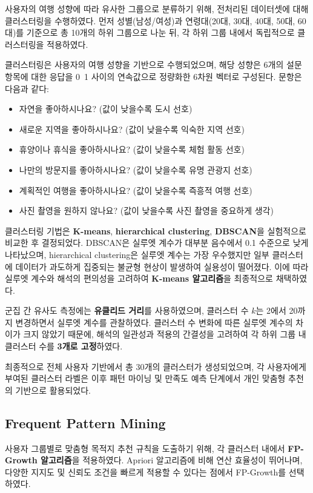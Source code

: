 \documentclass[sigconf]{acmart}
\begin{document}
\begin{CJK}{UTF8}{mj}
사용자의 여행 성향에 따라 유사한 그룹으로 분류하기 위해, 전처리된 데이터셋에 대해 클러스터링을 수행하였다. 먼저 성별(남성/여성)과 연령대(20대, 30대, 40대, 50대, 60대)를 기준으로 총 10개의 하위 그룹으로 나눈 뒤, 각 하위 그룹 내에서 독립적으로 클러스터링을 적용하였다.

클러스터링은 사용자의 여행 성향을 기반으로 수행되었으며, 해당 성향은 6개의 설문 항목에 대한 응답을 0~1 사이의 연속값으로 정량화한 6차원 벡터로 구성된다. 문항은 다음과 같다:
\begin{itemize}
  \item 자연을 좋아하시나요? (값이 낮을수록 도시 선호)
  \item 새로운 지역을 좋아하시나요? (값이 낮을수록 익숙한 지역 선호)
  \item 휴양이나 휴식을 좋아하시나요? (값이 낮을수록 체험 활동 선호)
  \item 나만의 방문지를 좋아하시나요? (값이 낮을수록 유명 관광지 선호)
  \item 계획적인 여행을 좋아하시나요? (값이 낮을수록 즉흥적 여행 선호)
  \item 사진 촬영을 원하지 않나요? (값이 낮을수록 사진 촬영을 중요하게 생각)
\end{itemize}

클러스터링 기법은 \textbf{K-means}, \textbf{hierarchical clustering}, \textbf{DBSCAN}을 실험적으로 비교한 후 결정되었다. DBSCAN은 실루엣 계수가 대부분 음수에서 0.1 수준으로 낮게 나타났으며, hierarchical clustering은 실루엣 계수는 가장 우수했지만 일부 클러스터에 데이터가 과도하게 집중되는 불균형 현상이 발생하여 실용성이 떨어졌다. 이에 따라 실루엣 계수와 해석의 편의성을 고려하여 \textbf{K-means 알고리즘}을 최종적으로 채택하였다.

군집 간 유사도 측정에는 \textbf{유클리드 거리}를 사용하였으며, 클러스터 수 $k$는 2에서 20까지 변경하면서 실루엣 계수를 관찰하였다. 클러스터 수 변화에 따른 실루엣 계수의 차이가 크지 않았기 때문에, 해석의 일관성과 적용의 간결성을 고려하여 각 하위 그룹 내 클러스터 수를 \textbf{3개로 고정}하였다.

최종적으로 전체 사용자 기반에서 총 30개의 클러스터가 생성되었으며, 각 사용자에게 부여된 클러스터 라벨은 이후 패턴 마이닝 및 만족도 예측 단계에서 개인 맞춤형 추천의 기반으로 활용되었다.


\subsection{Frequent Pattern Mining}

사용자 그룹별로 맞춤형 목적지 추천 규칙을 도출하기 위해, 각 클러스터 내에서 \textbf{FP-Growth 알고리즘}을 적용하였다. Apriori 알고리즘에 비해 연산 효율성이 뛰어나며, 다양한 지지도 및 신뢰도 조건을 빠르게 적용할 수 있다는 점에서 FP-Growth를 선택하였다.


\end{CJK}
\end{document}
